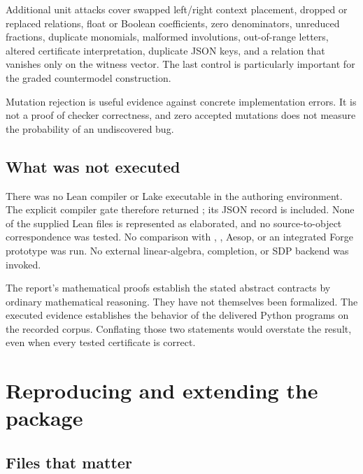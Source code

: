 Additional unit attacks cover swapped left/right context placement, dropped or
replaced relations, float or Boolean coefficients, zero denominators,
unreduced fractions, duplicate monomials, malformed involutions, out-of-range
letters, altered certificate interpretation, duplicate JSON keys, and a relation
that vanishes only on the witness vector. The last control is particularly
important for the graded countermodel construction.

Mutation rejection is useful evidence against concrete implementation errors.
It is not a proof of checker correctness, and zero accepted mutations does not
measure the probability of an undiscovered bug.

\subsection{What was not executed}

There was no Lean compiler or Lake executable in the authoring environment. The
explicit compiler gate therefore returned ; its JSON record is
included. None of the supplied Lean files is represented as elaborated, and no
source-to-object correspondence was tested. No comparison with ,
, Aesop, or an integrated Forge prototype was run. No
external linear-algebra, completion, or SDP backend was invoked.

The report's mathematical proofs establish the stated abstract contracts by
ordinary mathematical reasoning. They have not themselves been formalized.
The executed evidence establishes the behavior of the delivered Python programs
on the recorded corpus. Conflating those two statements would overstate the
result, even when every tested certificate is correct.

\section{Reproducing and extending the package}

\subsection{Files that matter}

